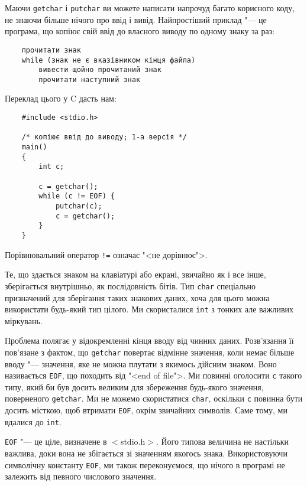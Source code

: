 \documentclass[a4paper,12pt]{book}
\begin{document}
  Маючи \texttt{getchar} і \texttt{putchar} ви можете написати напрочуд багато
  корисного коду, не знаючи більше нічого про ввід і вивід. Найпростіший приклад "---
  це програма, що копіює свій ввід до власного виводу по одному знаку за раз:
  \begin{verbatim}
    прочитати знак
    while (знак не є вказівником кінця файла)
        вивести щойно прочитаний знак
        прочитати наступний знак
  \end{verbatim}

  Переклад цього у C дасть нам:
  \begin{verbatim}
    #include <stdio.h>

    /* копіює ввід до виводу; 1-а версія */
    main()
    {
        int c;

        c = getchar();
        while (c != EOF) {
            putchar(c);
            c = getchar();
        }
    }
  \end{verbatim}

  Порівнювальний оператор \texttt{!=} означає "<не дорівнює">.

  Те, що здається знаком на клавіатурі або екрані, звичайно як і все інше, зберігається
  внутрішньо, як послідовність бітів. Тип \texttt{char} спеціально призначений для
  зберігання таких знакових даних, хоча для цього можна використати будь-який тип цілого.
  Ми скористалися \texttt{int} з тонких але важливих міркувань.

  Проблема полягає у відокремленні кінця вводу від чинних даних. Розв'язання її пов'язане
  з фактом, що \texttt{getchar} повертає відмінне значення, коли немає більше вводу
  "--- значення, яке не можна плутати з якимось дійсним знаком. Воно називається
  \texttt{EOF}, що походить від "<end of file">. Ми повинні оголосити \texttt{c}
  такого типу, який би був досить великим для збереження будь-якого значення, поверненого
  \texttt{getchar}. Ми не можемо скористатися \texttt{char}, оскільки \texttt{c} повинна
  бути досить місткою, щоб втримати \texttt{EOF}, окрім звичайних символів. Саме тому, ми
  вдалися до \texttt{int}.

  \texttt{EOF} "--- це ціле, визначене в \mbox{$<$}stdio.h\mbox{$>$}. Його типова величина не
  настільки важлива, доки вона не збігається зі значенням якогось знака. Використовуючи
  символічну константу \texttt{EOF}, ми також переконуємося, що нічого в програмі не
  залежить від певного числового значення.
\end{document}
